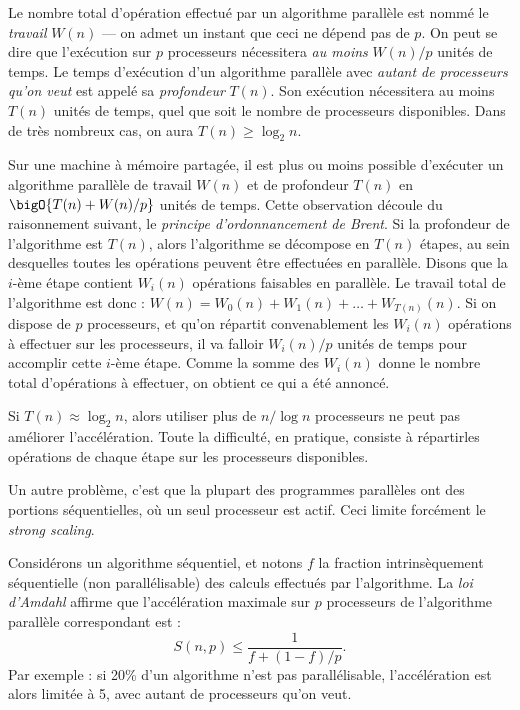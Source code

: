\begin{ddanger}
  Le nombre total d'opération effectué par un algorithme parallèle est nommé le
  \emph{travail} $W(n)$ --- on admet un instant que ceci ne dépend pas de
  $p$. On peut se dire que l'exécution sur $p$ processeurs nécessitera \emph{au
    moins} $W(n)/p$ unités de temps. Le temps d'exécution d'un algorithme
  parallèle avec \emph{autant de processeurs qu'on veut} est appelé sa
  \emph{profondeur} $T(n)$. Son exécution nécessitera au moins $T(n)$ unités de
  temps, quel que soit le nombre de processeurs disponibles. Dans de très
  nombreux cas, on aura $T(n) \geq \log_2 n$.

  Sur une machine à mémoire partagée, il est plus ou moins possible d'exécuter
  un algorithme parallèle de travail $W(n)$ et de profondeur $T(n)$ en
  $\bigO{T(n) + W(n) / p}$ unités de temps. Cette observation découle du
  raisonnement suivant, le \og \emph{principe d'ordonnancement de Brent}\fg. Si
  la profondeur de l'algorithme est $T(n)$, alors l'algorithme se décompose en
  $T(n)$ \og étapes\fg, au sein desquelles toutes les opérations peuvent être
  effectuées en parallèle. Disons que la $i$-ème étape contient $W_i(n)$
  opérations faisables en parallèle. Le travail total de l'algorithme est donc :
  $W(n) = W_0(n) + W_1(n) + \dots + W_{T(n)}(n)$. Si on dispose de $p$
  processeurs, et qu'on répartit convenablement les $W_i(n)$ opérations à
  effectuer sur les processeurs, il va falloir $W_i(n) / p$ unités de temps pour
  accomplir cette $i$-ème étape. Comme la somme des $W_i(n)$ donne le nombre
  total d'opérations à effectuer, on obtient ce qui a été annoncé.

  Si $T(n) \approx \log_2 n$, alors utiliser plus de $n/\log n$ processeurs ne
  peut pas améliorer l'accélération. Toute la difficulté, en pratique, consiste
  à \og répartir\fg les opérations de chaque étape sur les processeurs
  disponibles.
\end{ddanger}

Un autre problème, c'est que la plupart des programmes parallèles ont des
portions séquentielles, où un seul processeur est actif. Ceci limite forcément
le \textit{strong scaling}.

Considérons un algorithme séquentiel, et notons $f$ la fraction intrinsèquement
séquentielle (non parallélisable) des calculs effectués par l'algorithme. La
\emph{loi d'Amdahl} affirme que l'accélération maximale sur $p$ processeurs de
l'algorithme parallèle correspondant est :
\[
  S(n,p)  \leq  \frac{1}{f + (1 - f)/p}.
\]
Par exemple : si 20\% d'un algorithme n'est pas parallélisable, l'accélération
est alors limitée à 5, avec autant de processeurs qu'on veut.

